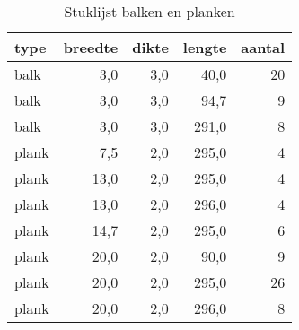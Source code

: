 \begin{table}[h!]
\centering
\caption{Stuklijst balken en planken}
\begin{tabular}{lrrrr}
\toprule
 type &  breedte &  dikte &  lengte &  aantal \\
\midrule
 balk &      3,0 &    3,0 &    40,0 &      20 \\
 balk &      3,0 &    3,0 &    94,7 &       9 \\
 balk &      3,0 &    3,0 &   291,0 &       8 \\
plank &      7,5 &    2,0 &   295,0 &       4 \\
plank &     13,0 &    2,0 &   295,0 &       4 \\
plank &     13,0 &    2,0 &   296,0 &       4 \\
plank &     14,7 &    2,0 &   295,0 &       6 \\
plank &     20,0 &    2,0 &    90,0 &       9 \\
plank &     20,0 &    2,0 &   295,0 &      26 \\
plank &     20,0 &    2,0 &   296,0 &       8 \\
\bottomrule
\end{tabular}
\end{table}
